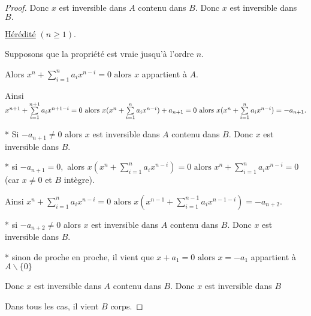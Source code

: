 \begin{proof}
	Donc $x$ est inversible dans $A$ contenu dans $ B.$ Donc $x$ est inversible dans $B.$
	
	\underline{Hérédité} $(n\geq 1)$.
	
	Supposons que la propriété est vraie jusqu'à l'ordre $n.$
	
	Alors $x^{n}+\sum\limits_{i=1}^{n}a_{i}x^{n-i}=0\text{ alors } x$ appartient à $ A.$
	
	Ainsi $x^{n+1}+\sum\limits_{i=1}^{n+1}a_{i}x^{n+1-i}=0\text{ alors } 
	x(x^{n}+\sum\limits_{i=1}^{n}a_{i}x^{n-i})+a_{n+1}=0\text{ alors } \\
	x(x^{n}+\sum\limits_{i=1}^{n}a_{i}x^{n-i})=-a_{n+1}.$
	
	* Si $-a_{n+1}\neq 0$ alors $x$ est inversible dans $A$ contenu dans $ B.$ Donc $x$
	est inversible dans $B.$
	
	* si $-a_{n+1}=0,$ alors $x(x^{n}+\sum\limits_{i=1}^{n}a_{i}x^{n-i})=0 \text{ alors } x^{n}+\sum\limits_{i=1}^{n}a_{i}x^{n-i}=0$\\ (car $x\neq 0$ et $B$ intègre).
	
	Ainsi $x^{n}+\sum\limits_{i=1}^{n}a_{i}x^{n-i}=0\text{ alors }
	x(x^{n-1}+\sum\limits_{i=1}^{n-1}a_{i}x^{n-1-i})=-a_{n+2}.$
	
	* si $-a_{n+2}\neq 0$ alors $x$ est inversible dans $A$ contenu dans $ B.$ Donc $x$ est inversible dans $B.$
	
	* sinon de proche en proche, il vient que $x+a_{1}=0\text{ alors } x=-a_{1}$ appartient à $
	A\backslash \{0\}$
	
	Donc $x$ est inversible dans $A$ contenu dans $ B.$ Donc $x$ est inversible dans $B$
	
	Dans tous les cas, il vient $B$ corps.
\end{proof}
